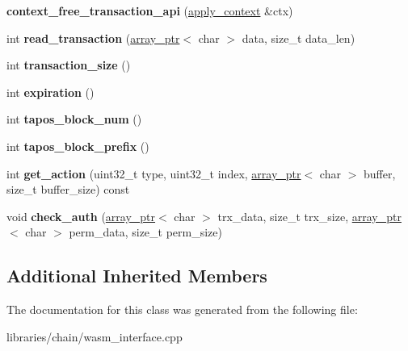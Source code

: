\begin{DoxyCompactItemize}
\item 
\mbox{\label{classaacio_1_1chain_1_1context__free__transaction__api_aecba4076976bf1a14de9a0242344a4d7}} 
{\bfseries context\+\_\+free\+\_\+transaction\+\_\+api} (\mbox{\hyperlink{classaacio_1_1chain_1_1apply__context}{apply\+\_\+context}} \&ctx)
\item 
\mbox{\label{classaacio_1_1chain_1_1context__free__transaction__api_adfcf266c8a8bc1a1cd2080afa2af07be}} 
int {\bfseries read\+\_\+transaction} (\mbox{\hyperlink{structaacio_1_1chain_1_1array__ptr}{array\+\_\+ptr}}$<$ char $>$ data, size\+\_\+t data\+\_\+len)
\item 
\mbox{\label{classaacio_1_1chain_1_1context__free__transaction__api_ae4b7b2e6a18cdc7ad159810aaceb96bd}} 
int {\bfseries transaction\+\_\+size} ()
\item 
\mbox{\label{classaacio_1_1chain_1_1context__free__transaction__api_a64587f08d408a43ea1f324fd0e2069e2}} 
int {\bfseries expiration} ()
\item 
\mbox{\label{classaacio_1_1chain_1_1context__free__transaction__api_a13140a9f38beba6a94af45db9f29ce8c}} 
int {\bfseries tapos\+\_\+block\+\_\+num} ()
\item 
\mbox{\label{classaacio_1_1chain_1_1context__free__transaction__api_a41f08049c64d66015e04a1cedeb3eef1}} 
int {\bfseries tapos\+\_\+block\+\_\+prefix} ()
\item 
\mbox{\label{classaacio_1_1chain_1_1context__free__transaction__api_a012029c51f223afb26af589d849627f6}} 
int {\bfseries get\+\_\+action} (uint32\+\_\+t type, uint32\+\_\+t index, \mbox{\hyperlink{structaacio_1_1chain_1_1array__ptr}{array\+\_\+ptr}}$<$ char $>$ buffer, size\+\_\+t buffer\+\_\+size) const
\item 
\mbox{\label{classaacio_1_1chain_1_1context__free__transaction__api_ad93ea4a788930c1c57a1224e2094838f}} 
void {\bfseries check\+\_\+auth} (\mbox{\hyperlink{structaacio_1_1chain_1_1array__ptr}{array\+\_\+ptr}}$<$ char $>$ trx\+\_\+data, size\+\_\+t trx\+\_\+size, \mbox{\hyperlink{structaacio_1_1chain_1_1array__ptr}{array\+\_\+ptr}}$<$ char $>$ perm\+\_\+data, size\+\_\+t perm\+\_\+size)
\end{DoxyCompactItemize}
\subsection*{Additional Inherited Members}


The documentation for this class was generated from the following file\+:\begin{DoxyCompactItemize}
\item 
libraries/chain/wasm\+\_\+interface.\+cpp\end{DoxyCompactItemize}
